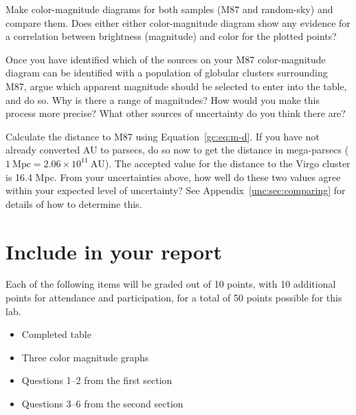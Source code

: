 \begin{steps}
	\item Make color-magnitude diagrams for both samples (M87 and random-sky)
	and compare them. Does either either color-magnitude diagram show any
	evidence for a correlation between brightness (magnitude) and color for the
	plotted points?
	
	\item Once you have identified which of the sources on your M87 color-magnitude
	diagram can be identified with a population of globular clusters surrounding
	M87, argue which apparent magnitude should be selected to enter into the table, and do so. Why is there a range of magnitudes? How would you make this
	process more precise? What other sources of uncertainty do you think
	there are?
	
	\item Calculate the distance to M87 using Equation~\ref{gc:eq:m-d}. If you have not already converted AU to
	parsecs, do so now to get the distance in mega-parsecs ($1\:\mathrm{Mpc} = 2.06 \times
	10^{11}\:\mathrm{AU}$). The accepted value for the distance to the Virgo cluster is 16.4
	Mpc. From your uncertainties above, how well do these two values agree within your expected level
	of uncertainty? See Appendix~\ref{unc:sec:comparing} for details of how to determine this.
\end{steps}

\section{Include in your report}

Each of the following items will be graded out of 10 points, with 10 additional points for attendance and participation, for a total of 50 points possible for this lab.

\begin{itemize}
	\item Completed table
	
	\item Three color magnitude graphs
	
	\item Questions 1--2 from the first section
	
	\item Questions 3--6 from the second section
		
\end{itemize}